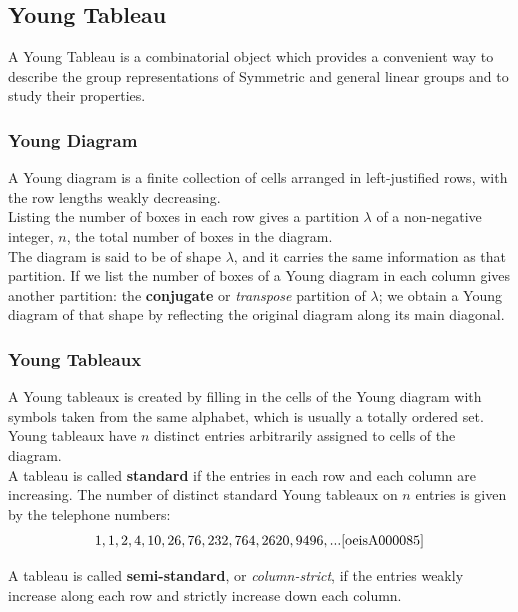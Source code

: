 \documentclass[12pt]{article}
\begin{document}
\subsection{Young Tableau}
A Young Tableau is a combinatorial object which provides a convenient way to describe the group representations of Symmetric and general linear groups and to study their properties.

\subsubsection{Young Diagram}
A Young diagram is a finite collection of cells arranged in left-justified rows, with the row lengths weakly decreasing.\\
Listing the number of boxes in each row gives a partition $\lambda$ of a non-negative integer, $n$, the total number of boxes in the diagram.\\
The diagram is said to be of shape $\lambda$, and it carries the same information as that partition. If we list the number of boxes of a Young diagram in each column gives another partition: the {\bf conjugate} or {\it transpose} partition of $\lambda$; we obtain a Young diagram of that shape by reflecting the original diagram along its main diagonal.

\subsubsection{Young Tableaux}
A Young tableaux is created by filling in the cells of the Young diagram with symbols taken from the same alphabet, which is usually a totally ordered set. Young tableaux have $n$ distinct entries arbitrarily assigned to cells of the diagram.\\
A tableau is called {\bf standard} if the entries in each row and each column are increasing. The number of distinct standard Young tableaux on $n$ entries is given by the telephone numbers:\\
\begin{equation}
\begin{split}
& 1, 1, 2, 4, 10, 26, 76, 232, 764, 2620, 9496, ... \cite{oeisA000085}\\
\end{split}
\end{equation}

A tableau is called {\bf semi-standard}, or {\it column-strict}, if the entries weakly increase along each row and strictly increase down each column.\\
\end{document}
